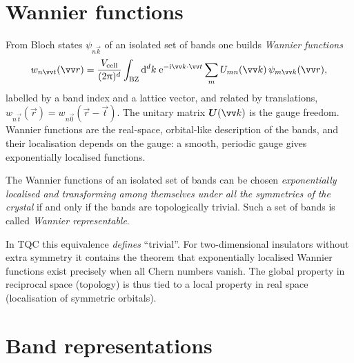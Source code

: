 \section{Wannier functions}

From Bloch states $\psi_{n\vec{k}}$ of an isolated set of bands one builds
\emph{Wannier functions}
\begin{equation}
w_{n\vec{t}}(\vec{r})=\frac{V_{\mathrm{cell}}}{(2\cpi)^d}\int_{\mathrm{BZ}}\dd^d k\;
\ee^{-\ii\vec{k}\cdot\vec{t}}\sum_m U_{mn}(\vec{k})\,\psi_{m\vec{k}}(\vec{r}),
\end{equation}
labelled by a band index and a lattice vector, and related by translations,
$w_{n\vec{t}}(\vec{r})=w_{n\vec{0}}(\vec{r}-\vec{t})$. The unitary matrix
$\mat{U}(\vec{k})$ is the gauge freedom. Wannier functions are the real-space,
orbital-like description of the bands, and their localisation depends on the gauge:
a smooth, periodic gauge gives exponentially localised functions.

\begin{keyresult}
The Wannier functions of an isolated set of bands can be chosen
\emph{exponentially localised and transforming among themselves under all the
symmetries of the crystal} if and only if the bands are topologically trivial. Such a
set of bands is called \emph{Wannier representable}.
\end{keyresult}
In TQC this equivalence \emph{defines} ``trivial''. For two-dimensional insulators
without extra symmetry it contains the theorem that exponentially localised Wannier
functions exist precisely when all Chern numbers vanish. The global property in
reciprocal space (topology) is thus tied to a local property in real space
(localisation of symmetric orbitals).

\section{Band representations}

